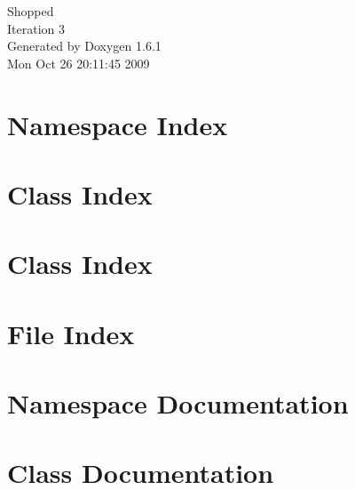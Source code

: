 \documentclass[a4paper]{book}
\begin{document}
\hypersetup{pageanchor=false}
\begin{titlepage}
\vspace*{7cm}
\begin{center}
{\Large Shopped \\[1ex]\large Iteration 3 }\\
\vspace*{1cm}
{\large Generated by Doxygen 1.6.1}\\
\vspace*{0.5cm}
{\small Mon Oct 26 20:11:45 2009}\\
\end{center}
\end{titlepage}
\clearemptydoublepage
{}
\tableofcontents
\clearemptydoublepage
{}
\hypersetup{pageanchor=true}
\chapter{Namespace Index}

\chapter{Class Index}

\chapter{Class Index}

\chapter{File Index}

\chapter{Namespace Documentation}






\chapter{Class Documentation}





















\end{document}
